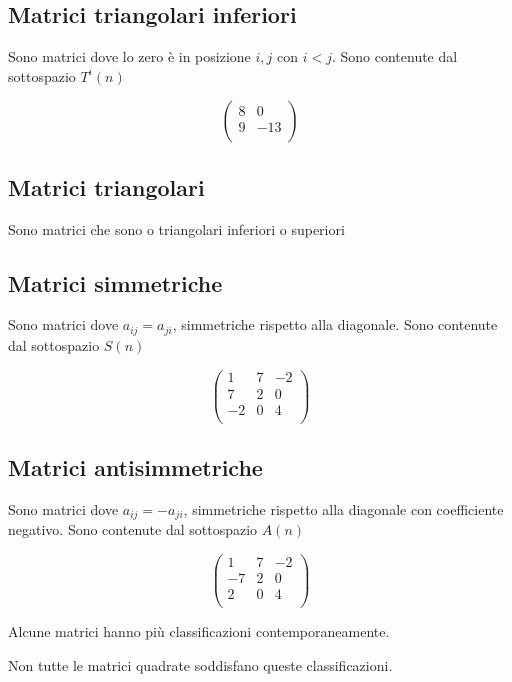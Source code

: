 \documentclass[a4paper, 10pt]{article}
\begin{document}
\subsection{Matrici triangolari inferiori}

Sono matrici dove lo zero è in posizione $ i, j $ con $ i < j$. Sono contenute dal sottospazio $T^i(n)$

$$\left(\begin{matrix}8&0\\9&-13\\\end{matrix}\right)$$

\subsection{Matrici triangolari}

Sono matrici che sono o triangolari inferiori o superiori

\subsection{Matrici simmetriche}

Sono matrici dove $ a_{ij} = a_{ji} $, simmetriche rispetto alla diagonale. Sono contenute dal sottospazio $S(n)$

$$\left(\begin{matrix}1&7&-2\\7&2&0\\-2&0&4\\\end{matrix}\right)$$

\subsection{Matrici antisimmetriche}

Sono matrici dove $ a_{ij} = -a_{ji} $, simmetriche rispetto alla diagonale con coefficiente negativo. Sono contenute dal sottospazio $A(n)$

$$\left(\begin{matrix}1&7&-2\\-7&2&0\\2&0&4\\\end{matrix}\right)$$

Alcune matrici hanno più classificazioni contemporaneamente.

Non tutte le matrici quadrate soddisfano queste classificazioni.
\end{document}
